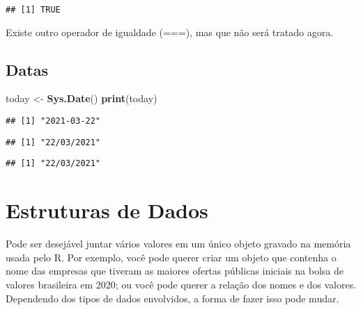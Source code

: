 \documentclass[
]{book}
\newenvironment{Shaded}{\begin{snugshade}}{\end{snugshade}}
\newcommand{\KeywordTok}[1]{\textcolor[rgb]{0.13,0.29,0.53}{\textbf{#1}}}
\newcommand{\NormalTok}[1]{#1}
\newcommand{\StringTok}[1]{\textcolor[rgb]{0.31,0.60,0.02}{#1}}
\begin{document}
\begin{verbatim}
## [1] TRUE
\end{verbatim}

Existe outro operador de igualdade (===), mas que não será tratado agora.

\hypertarget{datas}{%
\section{Datas}\label{datas}}

\begin{Shaded}
\begin{Highlighting}[]
\NormalTok{today <-}\StringTok{ }\KeywordTok{Sys.Date}\NormalTok{()}
\KeywordTok{print}\NormalTok{(today)}
\end{Highlighting}
\end{Shaded}

\begin{verbatim}
## [1] "2021-03-22"
\end{verbatim}

\begin{Shaded}
\end{Shaded}

\begin{verbatim}
## [1] "22/03/2021"
\end{verbatim}

\begin{Shaded}
\end{Shaded}

\begin{verbatim}
## [1] "22/03/2021"
\end{verbatim}

\hypertarget{estruturas-de-dados}{%
\chapter{Estruturas de Dados}\label{estruturas-de-dados}}

Pode ser desejável juntar vários valores em um único objeto gravado na memória usada pelo R. Por exemplo, você pode querer criar um objeto que contenha o nome das empresas que tiveram as maiores ofertas públicas iniciais na bolsa de valores brasileira em 2020; ou você pode querer a relação dos nomes e dos valores. Dependendo dos tipos de dados envolvidos, a forma de fazer isso pode mudar.
\end{document}
